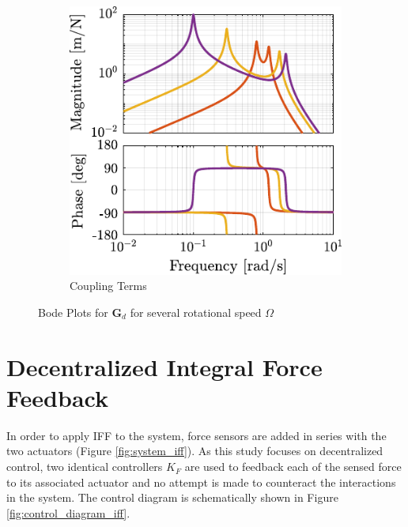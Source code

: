 \documentclass[10pt]{iopart}
\begin{document}
\begin{figure}[htbp]
\begin{subfigure}[c]{0.48\linewidth}
\includegraphics[width=\linewidth]{figs/plant_compare_rotating_speed_coupling.pdf}
\caption{\label{fig:plant_compare_rotating_speed_coupling} Coupling Terms}
\end{subfigure}
\hfill
\caption{\label{fig:plant_compare_rotating_speed}Bode Plots for \(\bm{G}_d\) for several rotational speed \(\Omega\)}
\centering
\end{figure}

\section{Decentralized Integral Force Feedback}
\label{sec:orgabd3121}
\label{sec:iff}
In order to apply IFF to the system, force sensors are added in series with the two actuators (Figure \ref{fig:system_iff}).
As this study focuses on decentralized control, two identical controllers \(K_F\) are used to feedback each of the sensed force to its associated actuator and no attempt is made to counteract the interactions in the system.
The control diagram is schematically shown in Figure \ref{fig:control_diagram_iff}.
\end{document}
